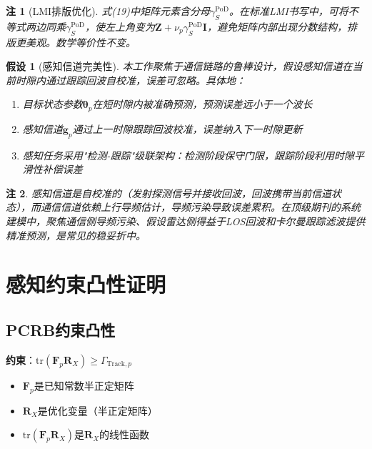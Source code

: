 \documentclass[12pt,a4paper]{article}
\newtheorem{assumption}{假设}
\newtheorem{remark}{注}
\newcommand{\vect}[1]{\mathbf{#1}}
\newcommand{\mat}[1]{\mathbf{#1}}
\newcommand{\tr}{\text{tr}}
\begin{document}
\begin{remark}[LMI排版优化]
式(19)中矩阵元素含分母$\gamma_S^{\text{PoD}}$。在标准LMI书写中，可将不等式两边同乘$\gamma_S^{\text{PoD}}$，使左上角变为$\mat{Z} + \nu_p \gamma_S^{\text{PoD}} \mat{I}$，避免矩阵内部出现分数结构，排版更美观。数学等价性不变。
\end{remark}

\begin{assumption}[感知信道完美性]\label{ass:2}
本工作聚焦于通信链路的鲁棒设计，假设感知信道在当前时隙内通过跟踪回波自校准，误差可忽略。具体地：
\begin{enumerate}
    \item 目标状态参数$\boldsymbol{\theta}_p$在短时隙内被准确预测，预测误差远小于一个波长
    \item 感知信道$\vect{g}_p$通过上一时隙跟踪回波校准，误差纳入下一时隙更新
    \item 感知任务采用"检测-跟踪"级联架构：检测阶段保守门限，跟踪阶段利用时隙平滑性补偿误差
\end{enumerate}
\end{assumption}

\begin{remark}
感知信道是自校准的（发射探测信号并接收回波，回波携带当前信道状态），而通信信道依赖上行导频估计，导频污染导致误差累积。在顶级期刊的系统建模中，聚焦通信侧导频污染、假设雷达侧得益于LOS回波和卡尔曼跟踪滤波提供精准预测，是常见的稳妥折中。
\end{remark}

\section{感知约束凸性证明}

\subsection{PCRB约束凸性}

\textbf{约束}：$\tr(\mat{F}_p \mat{R}_X) \geq \Gamma_{\text{Track},p}$

\begin{itemize}
    \item $\mat{F}_p$是已知常数半正定矩阵
    \item $\mat{R}_X$是优化变量（半正定矩阵）
    \item $\tr(\mat{F}_p \mat{R}_X)$是$\mat{R}_X$的线性函数
\end{itemize}
\end{document}
